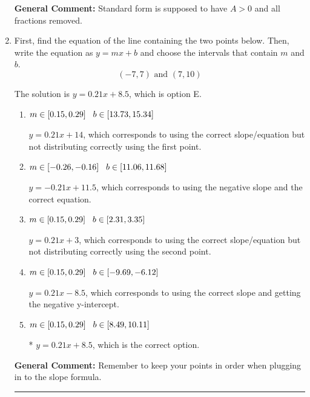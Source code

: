 \documentclass{extbook}[14pt]
\newcommand{\litem}[1]{\item #1

\rule{\textwidth}{0.4pt}}
\begin{document}
\begin{enumerate}
{\textbf{General Comment:} Standard form is supposed to have $A > 0$ and all fractions removed.
}
\litem{
First, find the equation of the line containing the two points below. Then, write the equation as $ y=mx+b $ and choose the intervals that contain $m$ and $b$.
\[ (-7, 7) \text{ and } (7, 10) \]

The solution is \( y = 0.21x + 8.5 \), which is option E.\begin{enumerate}[label=\Alph*.]
\item \( m \in [0.15, 0.29] \hspace*{3mm} b \in [13.73, 15.34] \)

 $y = 0.21x + 14$, which corresponds to using the correct slope/equation but not distributing correctly using the first point.
\item \( m \in [-0.26, -0.16] \hspace*{3mm} b \in [11.06, 11.68] \)

 $y = -0.21x + 11.5$, which corresponds to using the negative slope and the correct equation.
\item \( m \in [0.15, 0.29] \hspace*{3mm} b \in [2.31, 3.35] \)

 $y = 0.21x + 3$, which corresponds to using the correct slope/equation but not distributing correctly using the second point.
\item \( m \in [0.15, 0.29] \hspace*{3mm} b \in [-9.69, -6.12] \)

 $y = 0.21x -8.5$, which corresponds to using the correct slope and getting the negative y-intercept.
\item \( m \in [0.15, 0.29] \hspace*{3mm} b \in [8.49, 10.11] \)

* $y = 0.21x + 8.5$, which is the correct option.
\end{enumerate}

\textbf{General Comment:} Remember to keep your points in order when plugging in to the slope formula.
}
\end{enumerate}
\end{document}
